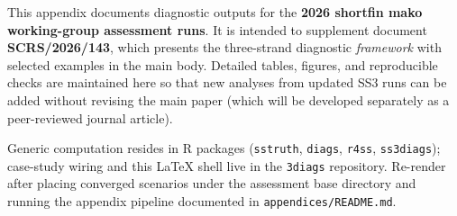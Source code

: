 
This appendix documents diagnostic outputs for the \textbf{2026 shortfin mako working-group assessment runs}. It is intended to supplement document \textbf{SCRS/2026/143}, which presents the three-strand diagnostic \textit{framework} with selected examples in the main body. Detailed tables, figures, and reproducible checks are maintained here so that new analyses from updated SS3 runs can be added without revising the main paper (which will be developed separately as a peer-reviewed journal article).

Generic computation resides in R packages (\texttt{sstruth}, \texttt{diags}, \texttt{r4ss}, \texttt{ss3diags}); case-study wiring and this LaTeX shell live in the \texttt{3diags} repository. Re-render after placing converged scenarios under the assessment base directory and running the appendix pipeline documented in \texttt{appendices/README.md}.




